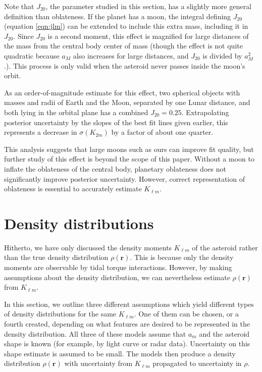 \documentclass[fleqn,usenatbib]{mnras}
\begin{document}
Note that $J_{20}$, the parameter studied in this section, has a slightly more general definition than oblateness. If the planet has a moon, the integral defining $J_{20}$ (equation \ref{eqn:jlm}) can be extended to include this extra mass, including it in $J_{20}$. Since $J_{20}$ is a second moment, this effect is magnified for large distances of the mass from the central body center of mass (though the effect is not quite quadratic because $a_M$ also increases for large distances, and $J_{20}$ is divided by $a_M^2$.). This process is only valid when the asteroid never passes inside the moon's orbit.

As an order-of-magnitude estimate for this effect, two spherical objects with masses and radii of Earth and the Moon, separated by one Lunar distance, and both lying in the orbital plane has a combined $J_{20} = 0.25$. Extrapolating posterior uncertainty by the slopes of the best fit lines given earlier, this represents a decrease in $\sigma(K_{2m})$ by a factor of about one quarter.

This analysis suggests that large moons such as ours can improve fit quality, but further study of this effect is beyond the scope of this paper. Without a moon to inflate the oblateness of the central body, planetary oblateness does not significantly improve posterior uncertainty. However, correct representation of oblateness is essential to accurately estimate $K_{\ell m}$.



\section{Density distributions}
\label{sec:distros}

Hitherto, we have only discussed the density moments $K_{\ell m}$ of the asteroid rather than the true density distribution $\rho(\bm r)$. This is because only the density moments are observable by tidal torque interactions. However, by making assumptions about the density distribution, we can nevertheless estimate $\rho(\bm r)$ from $K_{\ell m}$.

In this section, we outline three different assumptions which yield different types of density distributions for the same $K_{\ell m}$. One of them can be chosen, or a fourth created, depending on what features are desired to be represented in the density distribution. All three of these models assume that $a_m$ and the asteroid shape is known (for example, by light curve or radar data). Uncertainty on this shape estimate is assumed to be small. The models then produce a density distribution $\rho(\bm r)$ with uncertainty from $K_{\ell m}$ propagated to uncertainty in $\rho$.
\end{document}
